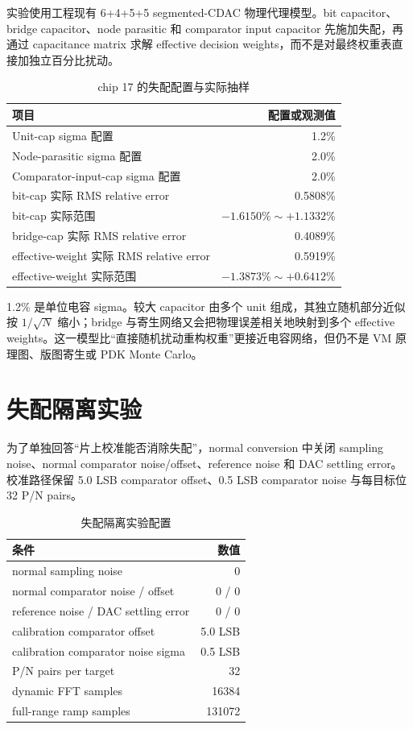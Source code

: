 \documentclass[UTF8,fontset=none,a4paper,11pt,openany]{ctexrep}
\begin{document}
实验使用工程现有 6+4+5+5 segmented-CDAC 物理代理模型。bit capacitor、bridge capacitor、node parasitic 和 comparator input capacitor 先施加失配，再通过 capacitance matrix 求解 effective decision weights，而不是对最终权重表直接加独立百分比扰动。

\begin{table}[H]
\centering
\caption{chip 17 的失配配置与实际抽样}
\label{tab:mismatch}
\begin{tabularx}{\textwidth}{Xr}
\toprule
项目 & 配置或观测值\\
\midrule
Unit-cap sigma 配置 & 1.2\%\\
Node-parasitic sigma 配置 & 2.0\%\\
Comparator-input-cap sigma 配置 & 2.0\%\\
bit-cap 实际 RMS relative error & 0.5808\%\\
bit-cap 实际范围 & $-1.6150\%\sim+1.1332\%$\\
bridge-cap 实际 RMS relative error & 0.4089\%\\
effective-weight 实际 RMS relative error & 0.5919\%\\
effective-weight 实际范围 & $-1.3873\%\sim+0.6412\%$\\
\bottomrule
\end{tabularx}
\end{table}

1.2\% 是单位电容 sigma。较大 capacitor 由多个 unit 组成，其独立随机部分近似按 $1/\sqrt N$ 缩小；bridge 与寄生网络又会把物理误差相关地映射到多个 effective weights。这一模型比“直接随机扰动重构权重”更接近电容网络，但仍不是 VM 原理图、版图寄生或 PDK Monte Carlo。

\section{失配隔离实验}

为了单独回答“片上校准能否消除失配”，normal conversion 中关闭 sampling noise、normal comparator noise/offset、reference noise 和 DAC settling error。校准路径保留 5.0 LSB comparator offset、0.5 LSB comparator noise 与每目标位 32 P/N pairs。

\begin{table}[H]
\centering
\caption{失配隔离实验配置}
\label{tab:mismatch-isolation}
\begin{tabularx}{\textwidth}{Xr}
\toprule
条件 & 数值\\
\midrule
normal sampling noise & 0\\
normal comparator noise / offset & 0 / 0\\
reference noise / DAC settling error & 0 / 0\\
calibration comparator offset & 5.0 LSB\\
calibration comparator noise sigma & 0.5 LSB\\
P/N pairs per target & 32\\
dynamic FFT samples & 16384\\
full-range ramp samples & 131072\\
\bottomrule
\end{tabularx}
\end{table}
\end{document}
